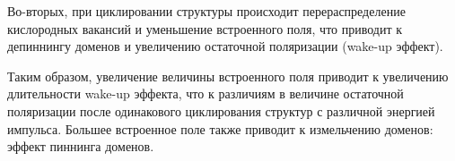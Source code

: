 Во-вторых, при циклировании структуры происходит перераспределение кислородных вакансий и уменьшение встроенного поля, что приводит к депиннингу доменов и увеличению остаточной поляризации (wake-up эффект).

Таким образом, увеличение величины встроенного поля приводит к увеличению длительности wake-up эффекта, что  к различиям в величине остаточной поляризации после одинакового циклирования структур с различной энергией импульса. Большее встроенное поле также приводит к измельчению доменов: эффект пиннинга доменов.